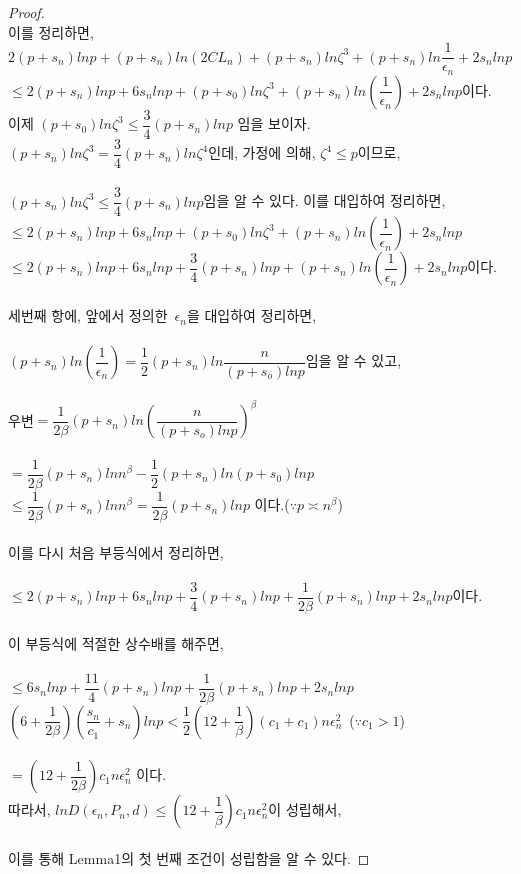 \begin{proof}
\\
이를 정리하면,\\
$2(p+s_n)lnp+(p+s_n)ln(2CL_n)+(p+s_n)ln\zeta^3+(p+s_n)ln\dfrac{1}{\epsilon_n}+2s_nlnp $\\
$\leq 2(p+s_n)lnp+6s_nlnp+(p+s_0)ln\zeta^3+(p+s_n)ln(\dfrac{1}{\epsilon_n})+2s_nlnp $이다.\\
이제 $(p+s_0)ln\zeta^3\leq \dfrac{3}{4}(p+s_n)lnp$ 임을 보이자.\\
$(p+s_n)ln\zeta^3=\dfrac{3}{4}(p+s_n)ln\zeta^4$인데, 가정에 의해, $\zeta^4\leq p$이므로,\\
\\
$(p+s_n)ln\zeta^3\leq \dfrac{3}{4}(p+s_n)lnp$임을 알 수 있다. 이를 대입하여 정리하면,\\
$\leq 2(p+s_n)lnp+6s_nlnp+(p+s_0)ln\zeta^3+(p+s_n)ln(\dfrac{1}{\epsilon_n})+2s_nlnp $\\
$\leq 2(p+s_n)lnp+6s_nlnp+\dfrac{3}{4}(p+s_n)lnp+(p+s_n)ln(\dfrac{1}{\epsilon_n})+2s_nlnp $이다.\\
\\
\noindent
세번째 항에, 앞에서 정의한\ $\epsilon_n$을 대입하여 정리하면,\\
\\
$(p+s_n)ln(\dfrac{1}{\epsilon_n})=\dfrac{1}{2}(p+s_n)ln\dfrac{n}{(p+s_o)lnp}$임을 알 수 있고,\\
\\
우변$= \dfrac{1}{2\beta}(p+s_n)ln\left(\dfrac{n}{(p+s_o)lnp}\right)^\beta$\\
\\
$=\dfrac{1}{2\beta}(p+s_n)lnn^\beta-\dfrac{1}{2}(p+s_n)ln(p+s_0)lnp$\\
$\leq \dfrac{1}{2\beta}(p+s_n)lnn^\beta=\dfrac{1}{2\beta}(p+s_n)lnp$ 이다.($\because p\asymp n^\beta  $)\\
\\
이를 다시 처음 부등식에서 정리하면,\\
\\
$\leq 2(p+s_n)lnp+6s_nlnp+\dfrac{3}{4}(p+s_n)lnp+\dfrac{1}{2\beta}(p+s_n)lnp+2s_nlnp $이다.\\
\\
이 부등식에 적절한 상수배를 해주면,\\
\\
$\leq 6s_nlnp+\dfrac{11}{4}(p+s_n)lnp+\dfrac{1}{2\beta}(p+s_n)lnp+2s_nlnp$\\
$(6+\dfrac{1}{2\beta})(\dfrac{s_n}{c_1}+s_n)lnp< \dfrac{1}{2}(12+\dfrac{1}{\beta})(c_1+c_1)n\epsilon_n^2$\ ($\because c_1>1$)\\
\\
$=(12+\dfrac{1}{2\beta})c_1n\epsilon_n^2$ 이다.\\
따라서, $lnD(\epsilon_n,P_n,d)\leq(12+\dfrac{1}{\beta})c_1n\epsilon_n^2$이 성립해서,\\
\\
이를 통해 Lemma1의 첫 번째 조건이 성립함을 알 수 있다.


\end{proof}

